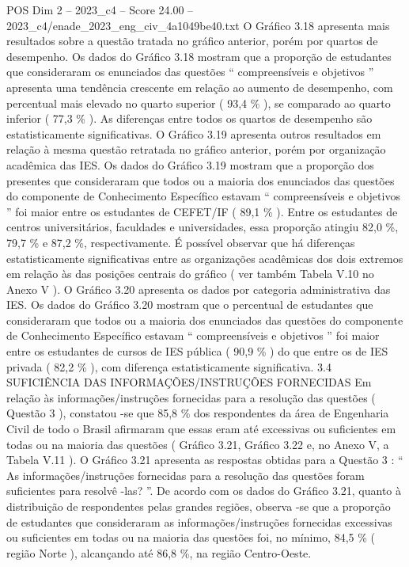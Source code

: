 \begin{textsample}{POS Dim 2 – 2023\_c4 – Score 24.00 – 2023\_c4/enade\_2023\_eng\_civ\_4a1049be40.txt}
O Gráfico 3.18 apresenta mais resultados sobre a questão tratada no gráfico anterior, porém por quartos de desempenho.
Os dados do Gráfico 3.18 mostram que a proporção de estudantes que consideraram os enunciados das questões “ compreensíveis e objetivos ” apresenta uma tendência crescente em relação ao aumento de desempenho, com percentual mais elevado no quarto superior ( 93,4 \% ), se comparado ao quarto inferior ( 77,3 \% ).
As diferenças entre todos os quartos de desempenho são estatisticamente significativas.
O Gráfico 3.19 apresenta outros resultados em relação à mesma questão retratada no gráfico anterior, porém por organização acadêmica das IES.
Os dados do Gráfico 3.19 mostram que a proporção dos presentes que consideraram que todos ou a maioria dos enunciados das questões do componente de Conhecimento Específico estavam “ compreensíveis e objetivos ” foi maior entre os estudantes de CEFET/IF ( 89,1 \% ).
Entre os estudantes de centros universitários, faculdades e universidades, essa proporção atingiu 82,0 \%, 79,7 \% e 87,2 \%, respectivamente.
É possível observar que há diferenças estatisticamente significativas entre as organizações acadêmicas dos dois extremos em relação às das posições centrais do gráfico ( ver também Tabela V.10 no Anexo V ).
O Gráfico 3.20 apresenta os dados por categoria administrativa das IES.
Os dados do Gráfico 3.20 mostram que o percentual de estudantes que consideraram que todos ou a maioria dos enunciados das questões do componente de Conhecimento Específico estavam “ compreensíveis e objetivos ” foi maior entre os estudantes de cursos de IES pública ( 90,9 \% ) do que entre os de IES privada ( 82,2 \% ), com diferença estatisticamente significativa. 3.4 SUFICIÊNCIA DAS INFORMAÇÕES/INSTRUÇÕES FORNECIDAS Em relação às informações/instruções fornecidas para a resolução das questões ( Questão 3 ), constatou -se que 85,8 \% dos respondentes da área de Engenharia Civil de todo o Brasil afirmaram que essas eram até excessivas ou suficientes em todas ou na maioria das questões ( Gráfico 3.21, Gráfico 3.22 e, no Anexo V, a Tabela V.11 ).
O Gráfico 3.21 apresenta as respostas obtidas para a Questão 3 : “ As informações/instruções fornecidas para a resolução das questões foram suficientes para resolvê -las? ”.
De acordo com os dados do Gráfico 3.21, quanto à distribuição de respondentes pelas grandes regiões, observa -se que a proporção de estudantes que consideraram as informações/instruções fornecidas excessivas ou suficientes em todas ou na maioria das questões foi, no mínimo, 84,5 \% ( região Norte ), alcançando até 86,8 \%, na região Centro-Oeste.

\end{textsample}
